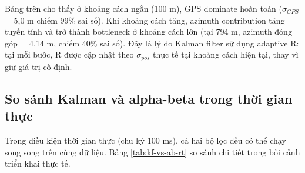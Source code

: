 Bảng trên cho thấy ở khoảng cách ngắn (100 m), GPS dominate hoàn toàn ($\sigma_{GPS}$ = 5,0 m chiếm 99\% sai số). Khi khoảng cách tăng, azimuth contribution tăng tuyến tính và trở thành bottleneck ở khoảng cách lớn (tại 794 m, azimuth đóng góp = 4,14 m, chiếm 40\% sai số). Đây là lý do Kalman filter sử dụng adaptive R: tại mỗi bước, R được cập nhật theo $\sigma_{pos}$ thực tế tại khoảng cách hiện tại, thay vì giữ giá trị cố định.

\subsection{So sánh Kalman và alpha-beta trong thời gian thực}

\hspace{0.5cm} Trong điều kiện thời gian thực (chu kỳ 100 ms), cả hai bộ lọc đều có thể chạy song song trên cùng dữ liệu. Bảng \ref{tab:kf-vs-ab-rt} so sánh chi tiết trong bối cảnh triển khai thực tế.



\begin{table}[H]
\centering
{}
\caption{So sánh Kalman và alpha-beta trong triển khai thời gian thực}
\label{tab:kf-vs-ab-rt}
\end{table}

